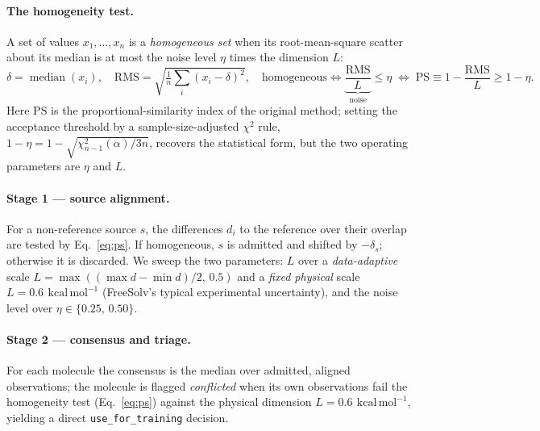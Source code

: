 \documentclass[11pt]{article}
\newcommand{\kcal}{\,\mathrm{kcal\,mol^{-1}}}
\begin{document}
\paragraph{The homogeneity test.} A set of values $x_1,\dots,x_n$ is a \emph{homogeneous set}
when its root-mean-square scatter about its median is at most the noise level $\eta$ times the
dimension $L$:
\begin{equation}
\delta = \operatorname{median}(x_i), \quad
\mathrm{RMS} = \sqrt{\tfrac{1}{n}\textstyle\sum_i (x_i-\delta)^2}, \quad
\text{homogeneous} \iff \underbrace{\frac{\mathrm{RMS}}{L}}_{\text{noise}} \le \eta
\;\Longleftrightarrow\; \mathrm{PS} \equiv 1-\frac{\mathrm{RMS}}{L} \ge 1-\eta .
\label{eq:ps}
\end{equation}
Here $\mathrm{PS}$ is the proportional-similarity index of the original method; setting the
acceptance threshold by a sample-size-adjusted $\chi^2$ rule, $1-\eta = 1-\sqrt{\chi^2_{n-1}(\alpha)/3n}$,
recovers the statistical form, but the two operating parameters are $\eta$ and $L$.

\paragraph{Stage 1 --- source alignment.} For a non-reference source $s$, the differences
$d_i$ to the reference over their overlap are tested by Eq.~\eqref{eq:ps}. If homogeneous, $s$
is admitted and shifted by $-\delta_s$; otherwise it is discarded. We sweep the two parameters:
$L$ over a \emph{data-adaptive} scale $L=\max((\max d-\min d)/2,\,0.5)$ and a \emph{fixed
physical} scale $L=\SI{0.6}{\kcal}$ (FreeSolv's typical experimental uncertainty), and the noise
level over $\eta\in\{0.25,\,0.50\}$.

\paragraph{Stage 2 --- consensus and triage.} For each molecule the consensus is the median
over admitted, aligned observations; the molecule is flagged \emph{conflicted} when its own
observations fail the homogeneity test (Eq.~\eqref{eq:ps}) against the physical dimension
$L=\SI{0.6}{\kcal}$, yielding a direct \texttt{use\_for\_training} decision.
\end{document}
